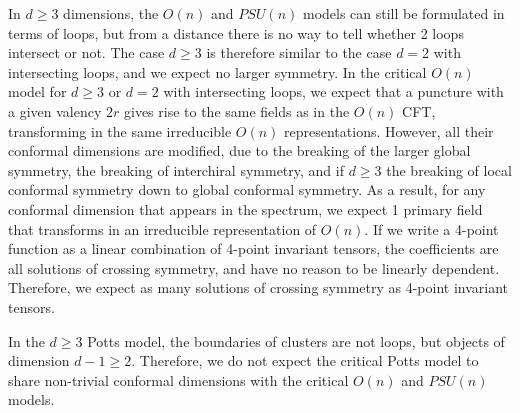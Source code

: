 \documentclass[12pt, a4paper]{article}
\begin{document}
In $d\geq 3$ dimensions, the $O(n)$ and $PSU(n)$ models can still be formulated in terms of loops, but
from a distance there is no way to tell whether 2 loops intersect or not. The case $d\geq 3$ is therefore similar to the case $d=2$ with intersecting loops, and we expect no larger symmetry. 
In the critical $O(n)$ model for $d\geq 3$ or $d=2$ with intersecting loops, we expect that a puncture with a given valency $2r$ gives rise to the same fields as in the $O(n)$ CFT, transforming in the same irreducible $O(n)$ representations. However, all their conformal dimensions are modified, due to the breaking of the larger global symmetry, the breaking of interchiral symmetry, and if $d\geq 3$ the breaking of local conformal symmetry down to global conformal symmetry. As a result, for any conformal dimension that appears in the spectrum, we expect 1 primary field that transforms in an irreducible representation of $O(n)$. If we write a 4-point function as a linear combination of 4-point invariant tensors, the coefficients are all solutions of crossing symmetry, and have no reason to be linearly dependent. Therefore, we expect as many solutions of crossing symmetry as 4-point invariant tensors. 

In the $d\geq 3$ Potts model, the boundaries of clusters are not loops, but objects of dimension $d-1\geq 2$. Therefore, we do not expect the critical Potts model to share non-trivial conformal dimensions with the critical $O(n)$ and $PSU(n)$ models. 





\printindex
\end{document}
